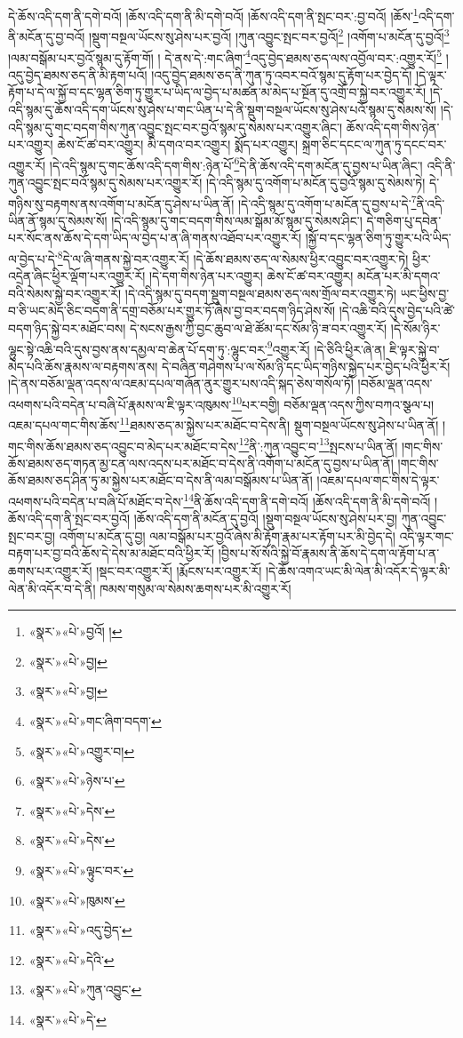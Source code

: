 དེ་ཆོས་འདི་དག་ནི་དགེ་བའོ། །ཆོས་འདི་དག་ནི་མི་དགེ་བའོ། །ཆོས་འདི་དག་ནི་སྤང་བར་:བྱ་བའོ། །ཆོས་\footnote{«སྣར་»«པེ་»བྱའོ། །}འདི་དག་ནི་མངོན་དུ་བྱ་བའོ། །སྡུག་བསྔལ་ཡོངས་སུ་ཤེས་པར་བྱའོ། །ཀུན་འབྱུང་སྤང་བར་བྱའོ།\footnote{«སྣར་»«པེ་»བྱ།} །འགོག་པ་མངོན་དུ་བྱའོ།\footnote{«སྣར་»«པེ་»བྱ།} །ལམ་བསྒོམ་པར་བྱའོ་སྙམ་དུ་རྟོག་གོ། །
དེ་ནས་དེ་:གང་ཞིག་\footnote{«སྣར་»«པེ་»གང་ཞིག་བདག་}འདུ་བྱེད་ཐམས་ཅད་ལས་འབྱོལ་བར་:འགྱུར་རོ།\footnote{«སྣར་»«པེ་»འགྱུར་བ།} །འདུ་བྱེད་ཐམས་ཅད་ནི་མི་རྟག་པའོ། །འདུ་བྱེད་ཐམས་ཅད་ནི་ཀུན་ཏུ་འབར་བའོ་སྙམ་དུ་རྟོག་པར་བྱེད་དོ། །དེ་ལྟར་རྟོག་པ་དེ་ལ་སྐྱོ་བ་དང་ལྷན་ཅིག་ཏུ་གྱུར་པ་ཡིད་ལ་བྱེད་པ་མཚན་མ་མེད་པ་སྔོན་དུ་འགྲོ་བ་སྐྱེ་བར་འགྱུར་རོ། །དེ་འདི་སྙམ་དུ་ཆོས་འདི་དག་ཡོངས་སུ་ཤེས་པ་གང་ཡིན་པ་དེ་ནི་སྡུག་བསྔལ་ཡོངས་སུ་ཤེས་པའོ་སྙམ་དུ་སེམས་སོ། །དེ་འདི་སྙམ་དུ་གང་བདག་གིས་ཀུན་འབྱུང་སྤང་བར་བྱའོ་སྙམ་དུ་སེམས་པར་འགྱུར་ཞིང་། ཆོས་འདི་དག་གིས་ཉེན་པར་འགྱུར། ཆེས་ངོ་ཚ་བར་འགྱུར། མི་དགའ་བར་འགྱུར། སྨོད་པར་འགྱུར། སྐྲག་ཅིང་དངང་ལ་ཀུན་ཏུ་དངང་བར་འགྱུར་རོ། །དེ་འདི་སྙམ་དུ་གང་ཆོས་འདི་དག་གིས་:ཉེན་པོ་\footnote{«སྣར་»«པེ་»ཉེས་པ་}དེ་ནི་ཆོས་འདི་དག་མངོན་དུ་བྱས་པ་ཡིན་ཞིང་། འདི་ནི་ཀུན་འབྱུང་སྤང་བའོ་སྙམ་དུ་སེམས་པར་འགྱུར་རོ། །དེ་འདི་སྙམ་དུ་འགོག་པ་མངོན་དུ་བྱའོ་སྙམ་དུ་སེམས་ཏེ། དེ་གཉིས་སུ་བརྟགས་ནས་འགོག་པ་མངོན་དུ་ཤེས་པ་ཡིན་ནོ། །དེ་འདི་སྙམ་དུ་འགོག་པ་མངོན་དུ་བྱས་པ་དེ་\footnote{«སྣར་»«པེ་»དེས་}ནི་འདི་ཡིན་ནོ་སྙམ་དུ་སེམས་སོ། །དེ་འདི་སྙམ་དུ་གང་བདག་གིས་ལམ་སྒོམ་མོ་སྙམ་དུ་སེམས་ཤིང་། དེ་གཅིག་པུ་དབེན་པར་སོང་ནས་ཆོས་དེ་དག་ཡིད་ལ་བྱེད་པ་ན་ཞི་གནས་འཐོབ་པར་འགྱུར་རོ། །སྐྱོ་བ་དང་ལྷན་ཅིག་ཏུ་གྱུར་པའི་ཡིད་ལ་བྱེད་པ་དེ་\footnote{«སྣར་»«པེ་»དེས་}དེ་ལ་ཞི་གནས་སྐྱེ་བར་འགྱུར་རོ། །དེ་ཆོས་ཐམས་ཅད་ལ་སེམས་ཕྱིར་འབྱུང་བར་འགྱུར་ཏེ། ཕྱིར་འདྲེན་ཞིང་ཕྱིར་ལྡོག་པར་འགྱུར་རོ། །དེ་དག་གིས་ཉེན་པར་འགྱུར། ཆེས་ངོ་ཚ་བར་འགྱུར། མངོན་པར་མི་དགའ་བའི་སེམས་སྐྱེ་བར་འགྱུར་རོ། །དེ་འདི་སྙམ་དུ་བདག་སྡུག་བསྔལ་ཐམས་ཅད་ལས་གྲོལ་བར་འགྱུར་ཏེ། ཡང་ཕྱིས་བྱ་བ་ཅི་ཡང་མེད་ཅིང་བདག་ནི་དགྲ་བཅོམ་པར་གྱུར་ཏོ་ཞེས་བྱ་བར་བདག་ཉིད་ཤེས་སོ། །དེ་འཆི་བའི་དུས་བྱེད་པའི་ཚེ་བདག་ཉིད་སྐྱེ་བར་མཐོང་བས། དེ་སངས་རྒྱས་ཀྱི་བྱང་ཆུབ་ལ་ཐེ་ཚོམ་དང་སོམ་ཉི་ཟ་བར་འགྱུར་རོ། །དེ་སོམ་ཉིར་ལྷུང་སྟེ་འཆི་བའི་དུས་བྱས་ནས་དམྱལ་བ་ཆེན་པོ་དག་ཏུ་:ལྷུང་བར་\footnote{«སྣར་»«པེ་»ལྟུང་བར་}འགྱུར་རོ། །དེ་ཅིའི་ཕྱིར་ཞེ་ན། ཇི་ལྟར་སྐྱེ་བ་མེད་པའི་ཆོས་རྣམས་ལ་བརྟགས་ནས། དེ་བཞིན་གཤེགས་པ་ལ་སོམ་ཉི་དང་ཡིད་གཉིས་སྐྱེད་པར་བྱེད་པའི་ཕྱིར་རོ། །དེ་ནས་བཅོམ་ལྡན་འདས་ལ་འཇམ་དཔལ་གཞོན་ནུར་གྱུར་པས་འདི་སྐད་ཅེས་གསོལ་ཏོ། །བཅོམ་ལྡན་འདས་འཕགས་པའི་བདེན་པ་བཞི་པོ་རྣམས་ལ་ཇི་ལྟར་འཁུམས་\footnote{«སྣར་»«པེ་»ཁུམས་}པར་བགྱི། བཅོམ་ལྡན་འདས་ཀྱིས་བཀའ་སྩལ་པ། འཇམ་དཔལ་གང་གིས་ཆོས་\footnote{«སྣར་»«པེ་»འདུ་བྱེད་}ཐམས་ཅད་མ་སྐྱེས་པར་མཐོང་བ་དེས་ནི། སྡུག་བསྔལ་ཡོངས་སུ་ཤེས་པ་ཡིན་ནོ། །གང་གིས་ཆོས་ཐམས་ཅད་འབྱུང་བ་མེད་པར་མཐོང་བ་དེས་\footnote{«སྣར་»«པེ་»དེའི་}ནི་:ཀུན་འབྱུང་བ་\footnote{«སྣར་»«པེ་»ཀུན་འབྱུང་}སྤངས་པ་ཡིན་ནོ། །གང་གིས་ཆོས་ཐམས་ཅད་གཏན་མྱ་ངན་ལས་འདས་པར་མཐོང་བ་དེས་ནི་འགོག་པ་མངོན་དུ་བྱས་པ་ཡིན་ནོ། །གང་གིས་ཆོས་ཐམས་ཅད་ཤིན་ཏུ་མ་སྐྱེས་པར་མཐོང་བ་དེས་ནི་ལམ་བསྒོམས་པ་ཡིན་ནོ། །འཇམ་དཔལ་གང་གིས་དེ་ལྟར་འཕགས་པའི་བདེན་པ་བཞི་པོ་མཐོང་བ་དེས་\footnote{«སྣར་»«པེ་»དེ་}ནི་ཆོས་འདི་དག་ནི་དགེ་བའོ། །ཆོས་འདི་དག་ནི་མི་དགེ་བའོ། །ཆོས་འདི་དག་ནི་སྤང་བར་བྱའོ། །ཆོས་འདི་དག་ནི་མངོན་དུ་བྱའོ། །སྡུག་བསྔལ་ཡོངས་སུ་ཤེས་པར་བྱ། ཀུན་འབྱུང་སྤང་བར་བྱ། འགོག་པ་མངོན་དུ་བྱ། ལམ་བསྒོམ་པར་བྱའོ་ཞེས་མི་རྟོག་རྣམ་པར་རྟོག་པར་མི་བྱེད་དེ། འདི་ལྟར་གང་བརྟག་པར་བྱ་བའི་ཆོས་དེ་དེས་མ་མཐོང་བའི་ཕྱིར་རོ། །བྱིས་པ་སོ་སོའི་སྐྱེ་བོ་རྣམས་ནི་ཆོས་དེ་དག་ལ་རྟོག་པ་ན་ཆགས་པར་འགྱུར་རོ། །སྡང་བར་འགྱུར་རོ། །རྨོངས་པར་འགྱུར་རོ། །དེ་ཆོས་འགའ་ཡང་མི་ལེན་མི་འདོར་དེ་ལྟར་མི་ལེན་མི་འདོར་བ་དེ་ནི། ཁམས་གསུམ་ལ་སེམས་ཆགས་པར་མི་འགྱུར་རོ། 